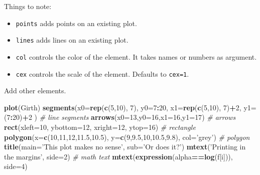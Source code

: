 \documentclass[]{book}
\newenvironment{Shaded}{\begin{snugshade}}{\end{snugshade}}
\newcommand{\CommentTok}[1]{\textcolor[rgb]{0.56,0.35,0.01}{\textit{#1}}}
\newcommand{\DataTypeTok}[1]{\textcolor[rgb]{0.13,0.29,0.53}{#1}}
\newcommand{\DecValTok}[1]{\textcolor[rgb]{0.00,0.00,0.81}{#1}}
\newcommand{\FloatTok}[1]{\textcolor[rgb]{0.00,0.00,0.81}{#1}}
\newcommand{\KeywordTok}[1]{\textcolor[rgb]{0.13,0.29,0.53}{\textbf{#1}}}
\newcommand{\NormalTok}[1]{#1}
\newcommand{\OperatorTok}[1]{\textcolor[rgb]{0.81,0.36,0.00}{\textbf{#1}}}
\newcommand{\StringTok}[1]{\textcolor[rgb]{0.31,0.60,0.02}{#1}}
\providecommand{\tightlist}{%
  \setlength{\itemsep}{0pt}\setlength{\parskip}{0pt}}
\theoremstyle{definition}
\theoremstyle{definition}
\theoremstyle{definition}
\theoremstyle{remark}
\begin{document}
Things to note:

\begin{itemize}
\tightlist
\item
  \texttt{points} adds points on an existing plot.
\item
  \texttt{lines} adds lines on an existing plot.
\item
  \texttt{col} controls the color of the element. It takes names or numbers as argument.
\item
  \texttt{cex} controls the scale of the element. Defaults to \texttt{cex=1}.
\end{itemize}

Add other elements.

\begin{Shaded}
\begin{Highlighting}[]
\KeywordTok{plot}\NormalTok{(Girth)}
\KeywordTok{segments}\NormalTok{(}\DataTypeTok{x0=}\KeywordTok{rep}\NormalTok{(}\KeywordTok{c}\NormalTok{(}\DecValTok{5}\NormalTok{,}\DecValTok{10}\NormalTok{), }\DecValTok{7}\NormalTok{), }\DataTypeTok{y0=}\DecValTok{7}\OperatorTok{:}\DecValTok{20}\NormalTok{, }\DataTypeTok{x1=}\KeywordTok{rep}\NormalTok{(}\KeywordTok{c}\NormalTok{(}\DecValTok{5}\NormalTok{,}\DecValTok{10}\NormalTok{), }\DecValTok{7}\NormalTok{)}\OperatorTok{+}\DecValTok{2}\NormalTok{, }\DataTypeTok{y1=}\NormalTok{(}\DecValTok{7}\OperatorTok{:}\DecValTok{20}\NormalTok{)}\OperatorTok{+}\DecValTok{2}\NormalTok{ ) }\CommentTok{# line segments}
\KeywordTok{arrows}\NormalTok{(}\DataTypeTok{x0=}\DecValTok{13}\NormalTok{,}\DataTypeTok{y0=}\DecValTok{16}\NormalTok{,}\DataTypeTok{x1=}\DecValTok{16}\NormalTok{,}\DataTypeTok{y1=}\DecValTok{17}\NormalTok{) }\CommentTok{# arrows}
\KeywordTok{rect}\NormalTok{(}\DataTypeTok{xleft=}\DecValTok{10}\NormalTok{, }\DataTypeTok{ybottom=}\DecValTok{12}\NormalTok{,  }\DataTypeTok{xright=}\DecValTok{12}\NormalTok{, }\DataTypeTok{ytop=}\DecValTok{16}\NormalTok{) }\CommentTok{# rectangle}
\KeywordTok{polygon}\NormalTok{(}\DataTypeTok{x=}\KeywordTok{c}\NormalTok{(}\DecValTok{10}\NormalTok{,}\DecValTok{11}\NormalTok{,}\DecValTok{12}\NormalTok{,}\FloatTok{11.5}\NormalTok{,}\FloatTok{10.5}\NormalTok{), }\DataTypeTok{y=}\KeywordTok{c}\NormalTok{(}\DecValTok{9}\NormalTok{,}\FloatTok{9.5}\NormalTok{,}\DecValTok{10}\NormalTok{,}\FloatTok{10.5}\NormalTok{,}\FloatTok{9.8}\NormalTok{), }\DataTypeTok{col=}\StringTok{'grey'}\NormalTok{) }\CommentTok{# polygon}
\KeywordTok{title}\NormalTok{(}\DataTypeTok{main=}\StringTok{'This plot makes no sense'}\NormalTok{, }\DataTypeTok{sub=}\StringTok{'Or does it?'}\NormalTok{) }
\KeywordTok{mtext}\NormalTok{(}\StringTok{'Printing in the margins'}\NormalTok{, }\DataTypeTok{side=}\DecValTok{2}\NormalTok{) }\CommentTok{# math text}
\KeywordTok{mtext}\NormalTok{(}\KeywordTok{expression}\NormalTok{(alpha}\OperatorTok{==}\KeywordTok{log}\NormalTok{(f[i])), }\DataTypeTok{side=}\DecValTok{4}\NormalTok{)}
\end{Highlighting}
\end{Shaded}
\end{document}
